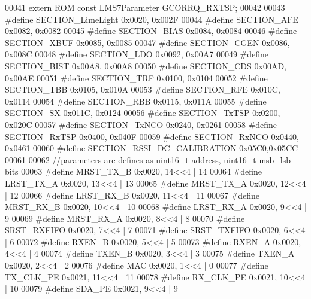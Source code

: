 \begin{DoxyCode}
00041 \textcolor{keyword}{extern} ROM \textcolor{keyword}{const} LMS7Parameter GCORRQ_RXTSP;
00042 
00043 \textcolor{preprocessor}{#define SECTION\_LimeLight 0x0020, 0x002F}
00044 \textcolor{preprocessor}{#define SECTION\_AFE 0x0082, 0x0082}
00045 \textcolor{preprocessor}{#define SECTION\_BIAS 0x0084, 0x0084}
00046 \textcolor{preprocessor}{#define SECTION\_XBUF 0x0085, 0x0085}
00047 \textcolor{preprocessor}{#define SECTION\_CGEN 0x0086, 0x008C}
00048 \textcolor{preprocessor}{#define SECTION\_LDO 0x0092, 0x00A7}
00049 \textcolor{preprocessor}{#define SECTION\_BIST 0x00A8, 0x00A8}
00050 \textcolor{preprocessor}{#define SECTION\_CDS 0x00AD, 0x00AE}
00051 \textcolor{preprocessor}{#define SECTION\_TRF 0x0100, 0x0104}
00052 \textcolor{preprocessor}{#define SECTION\_TBB 0x0105, 0x010A}
00053 \textcolor{preprocessor}{#define SECTION\_RFE 0x010C, 0x0114}
00054 \textcolor{preprocessor}{#define SECTION\_RBB 0x0115, 0x011A}
00055 \textcolor{preprocessor}{#define SECTION\_SX 0x011C, 0x0124}
00056 \textcolor{preprocessor}{#define SECTION\_TxTSP 0x0200, 0x020C}
00057 \textcolor{preprocessor}{#define SECTION\_TxNCO 0x0240, 0x0261}
00058 \textcolor{preprocessor}{#define SECTION\_RxTSP 0x0400, 0x040F}
00059 \textcolor{preprocessor}{#define SECTION\_RxNCO 0x0440, 0x0461}
00060 \textcolor{preprocessor}{#define SECTION\_RSSI\_DC\_CALIBRATION 0x05C0,0x05CC}
00061 
00062 \textcolor{comment}{//parameters are defines as uint16\_t address, uint16\_t msb\_lsb bits}
00063 \textcolor{preprocessor}{#define MRST\_TX\_B 0x0020, 14<<4 |  14}
00064 \textcolor{preprocessor}{#define LRST\_TX\_A 0x0020, 13<<4 |  13}
00065 \textcolor{preprocessor}{#define MRST\_TX\_A 0x0020, 12<<4 |  12}
00066 \textcolor{preprocessor}{#define LRST\_RX\_B 0x0020, 11<<4 |  11}
00067 \textcolor{preprocessor}{#define MRST\_RX\_B 0x0020, 10<<4 |  10}
00068 \textcolor{preprocessor}{#define LRST\_RX\_A 0x0020, 9<<4 |  9}
00069 \textcolor{preprocessor}{#define MRST\_RX\_A 0x0020, 8<<4 |  8}
00070 \textcolor{preprocessor}{#define SRST\_RXFIFO 0x0020, 7<<4 |  7}
00071 \textcolor{preprocessor}{#define SRST\_TXFIFO 0x0020, 6<<4 |  6}
00072 \textcolor{preprocessor}{#define RXEN\_B 0x0020, 5<<4 |  5}
00073 \textcolor{preprocessor}{#define RXEN\_A 0x0020, 4<<4 |  4}
00074 \textcolor{preprocessor}{#define TXEN\_B 0x0020, 3<<4 |  3}
00075 \textcolor{preprocessor}{#define TXEN\_A 0x0020, 2<<4 |  2}
00076 \textcolor{preprocessor}{#define MAC 0x0020, 1<<4 |  0}
00077 \textcolor{preprocessor}{#define TX\_CLK\_PE 0x0021, 11<<4 |  11}
00078 \textcolor{preprocessor}{#define RX\_CLK\_PE 0x0021, 10<<4 |  10}
00079 \textcolor{preprocessor}{#define SDA\_PE 0x0021, 9<<4 |  9}

\end{DoxyCode}
